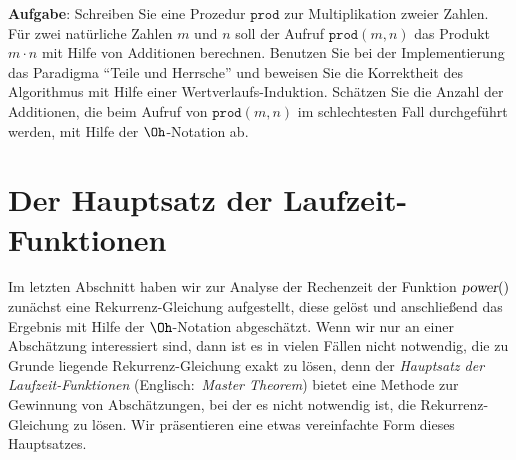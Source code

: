 \noindent
\textbf{Aufgabe}:
Schreiben Sie eine Prozedur $\mathtt{prod}$ zur Multiplikation zweier Zahlen.
F\"ur zwei nat\"urliche Zahlen $m$ und $n$ soll der Aufruf $\mathtt{prod}(m, n)$  das Produkt
$m\cdot n$ mit Hilfe von Additionen
berechnen.  Benutzen Sie bei der Implementierung das Paradigma ``Teile und Herrsche'' und
beweisen Sie die Korrektheit des Algorithmus mit Hilfe einer Wertverlaufs-Induktion.
Sch\"atzen  Sie die Anzahl der Additionen, die beim Aufruf von $\mathtt{prod}(m,n)$
im schlechtesten Fall durchgef\"uhrt werden, mit Hilfe der $\Oh$-Notation ab. 
\pagebreak

\section{Der Hauptsatz der Laufzeit-Funktionen}
Im letzten Abschnitt haben wir zur Analyse der Rechenzeit der Funktion $\textsl{power}()$
zun\"achst eine Rekurrenz-Gleichung aufgestellt, diese gel\"ost und anschlie{\ss}end das Ergebnis
mit Hilfe der $\Oh$-Notation abgesch\"atzt.  Wenn wir nur an einer Absch\"atzung interessiert
sind, dann ist es in vielen F\"allen nicht notwendig, die zu Grunde liegende
Rekurrenz-Gleichung exakt zu l\"osen, denn der \textsl{Hauptsatz der Laufzeit-Funktionen}
(Englisch:~\textsl{Master Theorem}) \cite{cormen:01} bietet eine Methode zur Gewinnung von Absch\"atzungen,
bei der es nicht notwendig ist, die Rekurrenz-Gleichung zu l\"osen.  
Wir pr\"asentieren eine etwas vereinfachte Form dieses Hauptsatzes.

